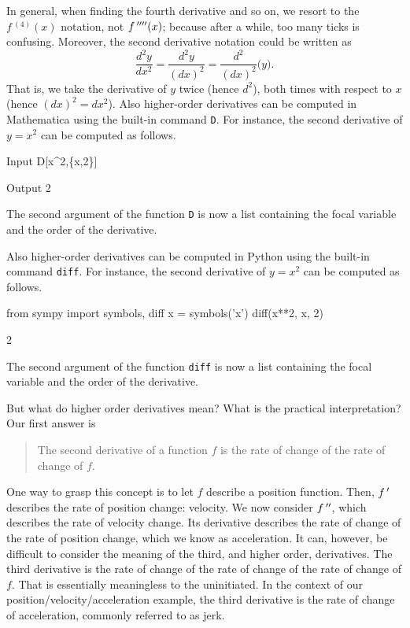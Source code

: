 In general, when finding the fourth derivative and so on, we resort to the $f\,^{(4)}(x)$ notation, not $f\,''''(x)$; because after a while, too many ticks is  confusing. Moreover, the second derivative notation could be written as 
$$\frac{d^2y}{dx^2}=\frac{d^2y}{(dx)^2}=\frac{d^2}{(dx)^2}\big(y\big).$$ 
That is, we take the derivative of $y$ twice (hence $d^2$), both times with respect to $x$ (hence $(dx)^2=dx^2$).
\ifmathematica
\ifcourse Also higher-order derivatives can be computed in Mathematica using the built-in command \lstinline{D}. For instance, the second derivative of $y=x^2$ can be computed as follows. 
	\begin{mdframed}[default,backgroundcolor=gray!40,roundcorner=8pt]
\begin{mmaCell}[morefunctionlocal={x}]{Input}
  D[x^2,\{x,2\}]
\end{mmaCell}

\begin{mmaCell}{Output}
  2
\end{mmaCell}
\end{mdframed}
The second argument of the function \lstinline{D} is now a list containing the focal variable and the order of the derivative. 
\fi
\fi

\ifpython
\ifcourse Also higher-order derivatives can be computed in Python using the built-in command \lstinline{diff}. For instance, the second derivative of $y=x^2$ can be computed as follows. 
\begin{pyin}
from sympy import symbols, diff
x = symbols('x')
diff(x**2, x, 2)
\end{pyin}
\begin{pyout}
2
\end{pyout}
The second argument of the function \lstinline{diff} is now a list containing the focal variable and the order of the derivative.
\fi
\fi

But what do higher order derivatives mean? What is the practical interpretation?
Our first answer is
	\begin{quote}
	The second derivative of a function $f$ is the rate of change of the rate of change of $f$.
	\end{quote}

One way to grasp this concept is to let $f$ describe a position function. Then, $f\,'$ describes the rate of position change: velocity. We now consider $f\,''$, which describes the rate of velocity change. Its derivative describes the  rate of change of the rate of position change, which we know as acceleration. It can, however, be difficult to consider the meaning of the third, and higher order, derivatives. The third derivative is the rate of change of the rate of change of the rate of change of $f$. That is essentially meaningless to the uninitiated. \ifcourse In the context of our position/velocity/acceleration example, the third derivative is the rate of change of acceleration, commonly referred to as jerk.

